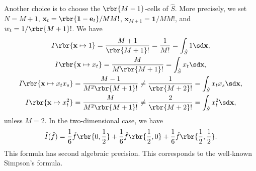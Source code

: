 \documentclass[english, nochinese]{pnote}
\begin{document}
Another choice is to choose the $ \rbr{ M - 1 } $-cells of $\hat{S}$. More precisely, we set $ N = M + 1 $, $ \mathbf{x}_t = \rbr{ \mathbf{1} - \mathbf{e}_t } / M M ! $, $ \mathbf{x}_{ M + 1 } = \mathbf{1} / M M ! $, and $ w_t = 1 / \rbr{ M + 1 } ! $. We have
\begin{gather}
I \rbr{ \mathbf{x} \mapsto 1 } = \frac{ M + 1 }{ \rbr{ M + 1 } ! } = \frac{1}{ M ! } = \int_{\hat{S}} 1 \sd \mathbf{x}, \\
I \rbr{ \mathbf{x} \mapsto x_t } = \frac{M}{ M \rbr{ M + 1 } ! } = \int_{\hat{S}} x_t \sd \mathbf{x}, \\
I \rbr{ \mathbf{x} \mapsto x_t x_s } = \frac{ M - 1 }{ M^2 \rbr{ M + 1 } ! } \neq \frac{1}{ \rbr{ M + 2 } ! } = \int_{\hat{S}} x_t x_s \sd \mathbf{x}, \\
I \rbr{ \mathbf{x} \mapsto x_t^2 } = \frac{M}{ M^2 \rbr{ M + 1 } ! } \neq \frac{2}{ \rbr{ M + 2 } ! } = \int_{\hat{S}} x_t^2 \sd \mathbf{x},
\end{gather}
unless $ M = 2 $. In the two-dimensional case, we have
\begin{equation}
\hat{I} (\hat{f}) = \frac{1}{6} \hat{f} \rbr{ 0, \frac{1}{2} } + \frac{1}{6} \hat{f} \rbr{ \frac{1}{2}, 0 } + \frac{1}{6} \hat{f} \rbr{ \frac{1}{2}, \frac{1}{2} }.
\end{equation}
This formula has second algebraic precision. This corresponds to the well-known Simpson's formula.
\end{document}
